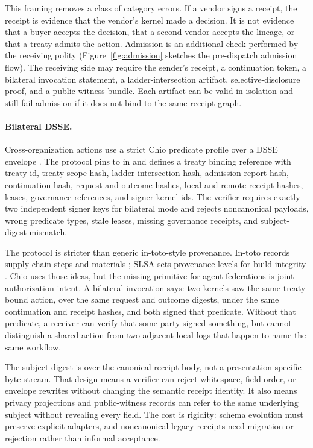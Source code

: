 This framing removes a class of category errors. If a vendor signs a receipt, the receipt is evidence that the vendor's kernel made a decision. It is not evidence that a buyer accepts the decision, that a second vendor accepts the lineage, or that a treaty admits the action. Admission is an additional check performed by the receiving polity (Figure~\ref{fig:admission} sketches the pre-dispatch admission flow). The receiving side may require the sender's receipt, a continuation token, a bilateral invocation statement, a ladder-intersection artifact, selective-disclosure proof, and a public-witness bundle. Each artifact can be valid in isolation and still fail admission if it does not bind to the same receipt graph.

\paragraph{Bilateral DSSE.}
Cross-organization actions use a strict Chio predicate profile over a DSSE envelope \cite{dsse}. The protocol pins  to  in  and defines a treaty binding reference with treaty id, treaty-scope hash, ladder-intersection hash, admission report hash, continuation hash, request and outcome hashes, local and remote receipt hashes, leases, governance references, and signer kernel ids. The verifier requires exactly two independent signer keys for bilateral mode and rejects noncanonical payloads, wrong predicate types, stale leases, missing governance receipts, and subject-digest mismatch.

The protocol is stricter than generic in-toto-style provenance. In-toto records supply-chain steps and materials \cite{torres2019intoto}; SLSA sets provenance levels for build integrity \cite{slsa}. Chio uses those ideas, but the missing primitive for agent federations is joint authorization intent. A bilateral invocation says: two kernels saw the same treaty-bound action, over the same request and outcome digests, under the same continuation and receipt hashes, and both signed that predicate. Without that predicate, a receiver can verify that some party signed something, but cannot distinguish a shared action from two adjacent local logs that happen to name the same workflow.

The subject digest is over the canonical receipt body, not a presentation-specific byte stream. That design means a verifier can reject whitespace, field-order, or envelope rewrites without changing the semantic receipt identity. It also means privacy projections and public-witness records can refer to the same underlying subject without revealing every field. The cost is rigidity: schema evolution must preserve explicit adapters, and noncanonical legacy receipts need migration or rejection rather than informal acceptance.

